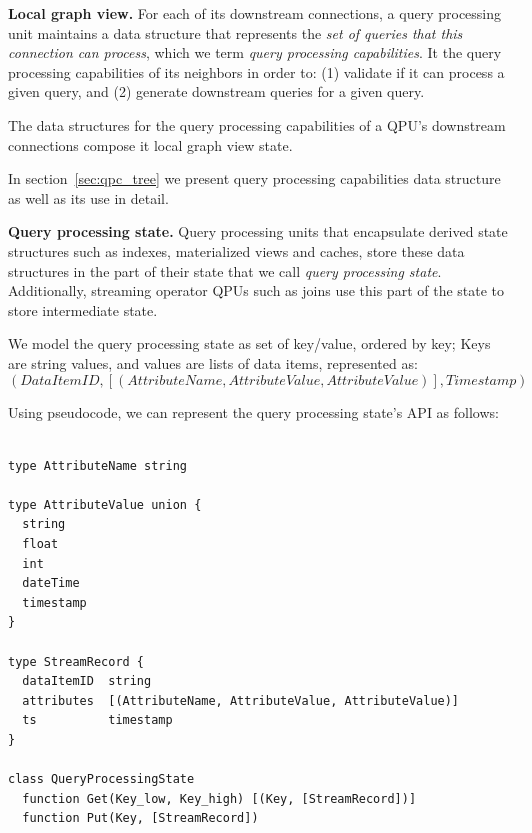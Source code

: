 
\medskip
\noindent
\textbf{Local graph view.}
For each of its downstream connections, a query processing unit maintains a data structure that represents the
\textit{set of queries that this connection can process}, which we term \textit{query processing capabilities}.
It the query processing capabilities of its neighbors in order to: (1) validate if it can process a given
query, and (2) generate downstream queries for a given query.

The data structures for the query processing capabilities of a QPU's downstream connections compose it local graph view
state.

In section~\ref{sec:qpc_tree} we present query processing capabilities data structure as well as its use in detail.

\medskip
\noindent
\textbf{Query processing state.}
Query processing units that encapsulate derived state structures such as indexes, materialized views and
caches, store these data structures in the part of their state that we call \textit{query processing state}.
Additionally, streaming operator QPUs such as joins use this part of the state to store intermediate state.

We model the query processing state as set of key/value, ordered by key;
Keys are string values, and values are lists of data items, represented as:
\[
  (DataItemID, [(AttributeName, AttributeValue, AttributeValue)], Timestamp)
\]

Using pseudocode, we can represent the query processing state's API as follows:

\begin{lstlisting}[caption={Pseudocode for the QPU's query processing state},captionpos=b,label={lst:qpustate}]

type AttributeName string

type AttributeValue union {
  string
  float
  int
  dateTime
  timestamp
}

type StreamRecord {
  dataItemID  string
  attributes  [(AttributeName, AttributeValue, AttributeValue)]
  ts          timestamp
}

class QueryProcessingState
  function Get(Key_low, Key_high) [(Key, [StreamRecord])]
  function Put(Key, [StreamRecord])

\end{lstlisting}

